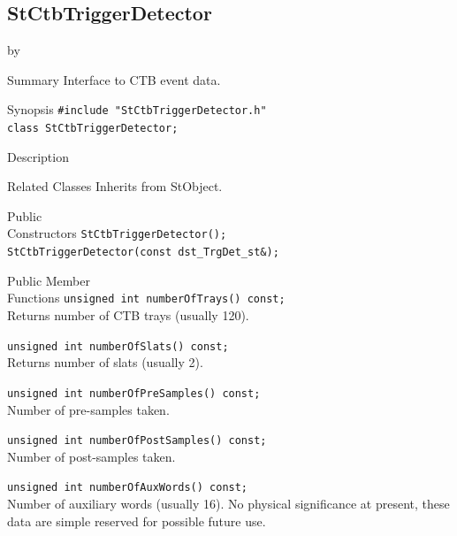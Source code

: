\documentclass[twoside]{article}
\newcommand{\entrylabel}[1]{\mbox{\textbf{{#1}}}\hfil}%
\newenvironment{entry}
{\begin{list}{}%
    {\renewcommand{\makelabel}{\entrylabel}%
     \setlength{\labelwidth}{90pt}%
     \setlength{\leftmargin}{\labelwidth}
     \advance\leftmargin by \labelsep%
      }%
    }%
  {\end{list}}
\newcommand{\Entrylabel}[1]%
{\raisebox{0pt}[1ex][0pt]{\makebox[\labelwidth][l]%
    {\parbox[t]{\labelwidth}{\hspace{0pt}\textbf{{#1}}}}}}
\newenvironment{Entry}%
{\renewcommand{\entrylabel}{\Entrylabel}\begin{entry}}%
  {\end{entry}}
\begin{document}
\subsection{StCtbTriggerDetector}
\label{sec:StCtbTriggerDetector}
\begin{Entry}
\item[Summary] Interface to CTB event data.
    
\item[Synopsis]
    \verb+#include "StCtbTriggerDetector.h"+\\
    \verb+class StCtbTriggerDetector;+\\
\item[Description]
    
\item[Related Classes]
    Inherits from StObject.
    
\item[Public\\ Constructors]
    \verb+StCtbTriggerDetector();+\\
    \verb+StCtbTriggerDetector(const dst_TrgDet_st&);+\\
    
\item[Public Member\\ Functions]
    \verb+unsigned int numberOfTrays() const;+\\
    Returns number of CTB trays (usually 120).
    
    \verb+unsigned int numberOfSlats() const;+\\
    Returns number of slats (usually 2).
    
    \verb+unsigned int numberOfPreSamples() const;+\\
    Number of pre-samples taken.
    
    \verb+unsigned int numberOfPostSamples() const;+\\
    Number of post-samples taken.
    
    \verb+unsigned int numberOfAuxWords() const;+\\
    Number of auxiliary words (usually 16).  No physical significance
    at present, these data are simple reserved for possible future
    use.
    

\end{Entry}
\end{document}

